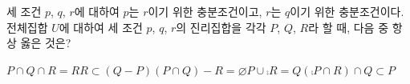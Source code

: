 세 조건 $p$, $q$, $r$에 대하여 $p$는 $r$이기 위한 충분조건이고, $r$는 $q$이기 위한 충분조건이다. 전체집합 $U$에 대하여 세 조건 $p$, $q$, $r$의 진리집합을 각각 $P$, $Q$, $R$라 할 때, 다음 중 항상 옳은 것은?
\begin{choicesii}{$P\cap Q\cap R=R$}{$R\subset(Q-P)$}{$(P\cap Q)-R=\varnothing$}{$P\cup\comp{R}=Q$}{$(\comp{P}\cap R)\cap Q\subset P$}\end{choicesii}
